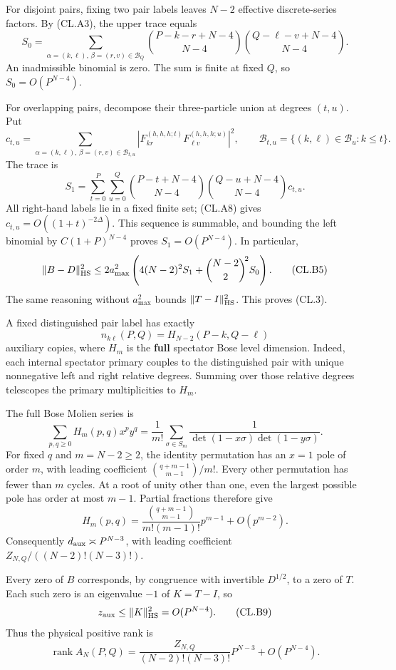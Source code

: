 For disjoint pairs, fixing two pair labels leaves \(N-2\) effective discrete-series factors. By (CL.A3), the upper trace equals \[
S_0=\sum_{\alpha=(k,\ell),\,\beta=(r,v)\in\mathcal B_Q}
\binom{P-k-r+N-4}{N-4}
\binom{Q-\ell-v+N-4}{N-4}.
\tag{CL.B3}
\] An inadmissible binomial is zero. The sum is finite at fixed \(Q\), so \(S_0=O(P^{N-4})\).

For overlapping pairs, decompose their three-particle union at degrees \((t,u)\). Put \[
c_{t,u}=\sum_{\alpha=(k,\ell),\,\beta=(r,v)\in\mathcal B_{t,u}}
|F_{kr}^{(h,h,h;t)}F_{\ell v}^{(h,h,h;u)}|^2,\qquad
\mathcal B_{t,u}=\{(k,\ell)\in\mathcal B_u:k\leq t\}.
\] The trace is \[
S_1=\sum_{t=0}^P\sum_{u=0}^Q
\binom{P-t+N-4}{N-4}
\binom{Q-u+N-4}{N-4}c_{t,u}.
\tag{CL.B4}
\] All right-hand labels lie in a fixed finite set; (CL.A8) gives \(c_{t,u}=O((1+t)^{-2\Delta})\). This sequence is summable, and bounding the left binomial by \(C(1+P)^{N-4}\) proves \(S_1=O(P^{N-4})\). In particular, \[
\|B-D\|_{\rm HS}^2
\leq2a_{\max}^2
\left(4(N-2)^2S_1+\binom{N-2}{2}^{\!2}S_0\right).
\tag{CL.B5}
\] The same reasoning without \(a_{\max}^2\) bounds \(\|T-I\|_{\rm HS}^2\). This proves (CL.3).

A fixed distinguished pair label has exactly \[
n_{k\ell}(P,Q)=H_{N-2}(P-k,Q-\ell)
\tag{CL.B6}
\] auxiliary copies, where \(H_m\) is the \textbf{full} spectator Bose level dimension. Indeed, each internal spectator primary couples to the distinguished pair with unique nonnegative left and right relative degrees. Summing over those relative degrees telescopes the primary multiplicities to \(H_m\).

The full Bose Molien series is \[
\sum_{p,q\geq0}H_m(p,q)x^py^q
=\frac1{m!}\sum_{\sigma\in S_m}
\frac1{\det(1-x\sigma)\det(1-y\sigma)}.
\tag{CL.B7}
\] For fixed \(q\) and \(m=N-2\geq2\), the identity permutation has an \(x=1\) pole of order \(m\), with leading coefficient \(\binom{q+m-1}{m-1}/m!\). Every other permutation has fewer than \(m\) cycles. At a root of unity other than one, even the largest possible pole has order at most \(m-1\). Partial fractions therefore give \[
H_m(p,q)=
\frac{\binom{q+m-1}{m-1}}{m!(m-1)!}p^{m-1}
+O(p^{m-2}).
\tag{CL.B8}
\] Consequently \(d_{\rm aux}\asymp P^{N-3}\), with leading coefficient \(Z_{N,Q}/((N-2)!(N-3)!)\).

Every zero of \(B\) corresponds, by congruence with invertible \(D^{1/2}\), to a zero of \(T\). Each such zero is an eigenvalue \(-1\) of \(K=T-I\), so \[
z_{\rm aux}\leq\|K\|_{\rm HS}^2=O(P^{N-4}).
\tag{CL.B9}
\] Thus the physical positive rank is \[
\operatorname{rank}A_N(P,Q)
=\frac{Z_{N,Q}}{(N-2)!(N-3)!}P^{N-3}+O(P^{N-4}).
\tag{CL.B10}
\]

